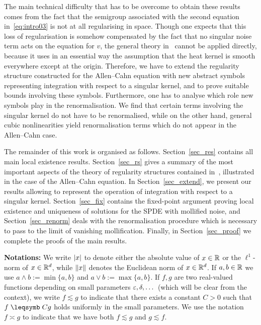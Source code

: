 \documentclass[reqno,11pt]{article}
\begin{document}
The main technical difficulty that has to be overcome to obtain these results
comes from the fact that the semigroup associated with the second equation
in~\eqref{eq:intro03} is not at all regularising in space. Though one
expects that this loss of regularisation is somehow compensated by the fact that
no singular noise term acts on the equation for $v$, the general theory
in~\cite{Hairer2014} cannot be applied directly, because it uses in an essential
way the assumption that the heat kernel is smooth everywhere except at the
origin. Therefore, we have to extend the regularity structure constructed for
the Allen--Cahn equation with new abstract symbols representing integration with
respect to a singular kernel, and to prove suitable bounds involving these
symbols. Furthermore, one has to analyse which role new symbols play in the
renormalisation. We find that certain terms involving the singular kernel do not
have to be renormalised, while on the other hand, general cubic
nonlinearities yield renormalisation terms which do not appear in the
Allen--Cahn case.

The remainder of this work is organised as follows. Section~\ref{sec_res}
contains all main local existence results. Section~\ref{sec_rs} gives a summary
of the most important aspects of the theory of regularity structures contained
in~\cite{Hairer2014}, illustrated in the case of the Allen--Cahn equation. In
Section~\ref{sec_extend}, we present our results allowing to represent the
operation of integration with respect to a singular kernel.
Section~\ref{sec_fix} contains the fixed-point argument proving local existence
and uniqueness of solutions for the SPDE with mollified noise, and
Section~\ref{sec_renorm} deals with the renormalisation procedure which is
necessary to pass to the limit of vanishing mollification. Finally, in
Section~\ref{sec_proof} we complete the proofs of the main results. 

\medskip


\noindent
\textbf{Notations:} We write $\lvert x\rvert$ to denote either the absolute value of
$x\in\mathbb{R}$ or the $\ell^1$-norm of $x\in\mathbb{R}^{d}$, while $\lVert x\rVert$ denotes the
Euclidean norm of $x\in\mathbb{R}^{d}$. If $a,b\in\mathbb{R}$ we use $a\wedge b:=\min\{a,b\}$
and $a\vee b:=\max\{a,b\}$. If $f, g$ are two real-valued functions depending on
small parameters $\varepsilon, \delta, \dots$ (which will be clear from the context),
we write $f\lesssim g$ to indicate that there exists a constant $C>0$ such that
$f \leqs Cg$ holds uniformly in the small parameters. We use the notation
$f\asymp g$ to indicate that we have both $f\lesssim g$ and $g\lesssim f$. 
\end{document}
